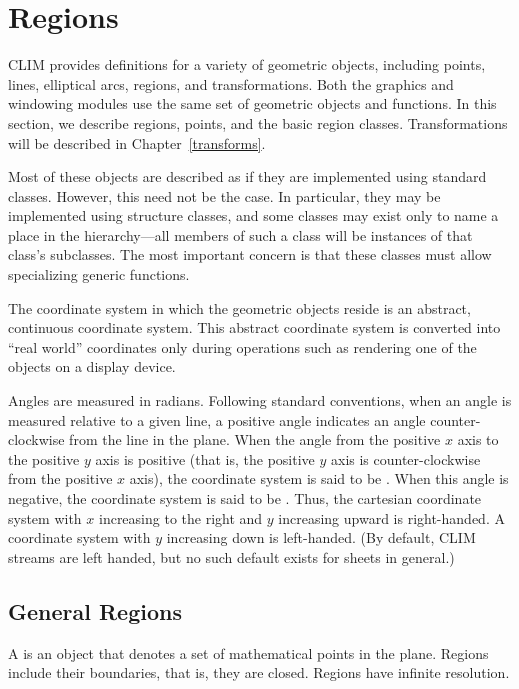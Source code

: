 
\chapter {Regions}
\label {regions}

CLIM provides definitions for a variety of geometric objects, including points,
lines, elliptical arcs, regions, and transformations.  Both the graphics and
windowing modules use the same set of geometric objects and functions.  In this
section, we describe regions, points, and the basic region classes.
Transformations will be described in Chapter~\ref{transforms}.

Most of these objects are described as if they are implemented using standard
classes.  However, this need not be the case.  In particular, they may be
implemented using structure classes, and some classes may exist only to name a
place in the hierarchy---all members of such a class will be instances of that
class's subclasses.  The most important concern is that these classes must allow
specializing generic functions.

The coordinate system in which the geometric objects reside is an abstract,
continuous coordinate system.  This abstract coordinate system is converted into
``real world'' coordinates only during operations such as rendering one of the
objects on a display device.

Angles are measured in radians.  Following standard conventions, when an angle
is measured relative to a given line, a positive angle indicates an angle
counter-clockwise from the line in the plane.  When the angle from the positive
$x$ axis to the positive $y$ axis is positive (that is, the positive $y$ axis is
counter-clockwise from the positive $x$ axis), the coordinate system is said to
be .  When this angle is negative, the coordinate system
is said to be .  Thus, the cartesian coordinate system with
$x$ increasing to the right and $y$ increasing upward is right-handed.  A
coordinate system with $y$ increasing down is left-handed.  (By default, CLIM
streams are left handed, but no such default exists for sheets in general.)


\section {General Regions}

A  is an object that denotes a set of mathematical points in the
plane.  Regions include their boundaries, that is, they are closed.  Regions
have infinite resolution.

